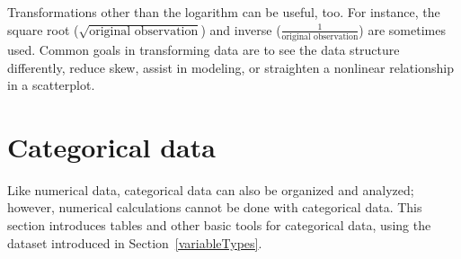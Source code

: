 \begin{doublespace}

Transformations other than the logarithm can be useful, too. For instance, the square root ($\sqrt{\text{original observation}}$) and inverse ($\frac{1}{\text{original observation}}$) are sometimes used. Common goals in transforming data are to see the data structure differently, reduce skew, assist in modeling, or straighten a nonlinear relationship in a scatterplot.


\textC{\newpage}


\section[Categorical data]{Categorical data}
\label{categoricalData}


Like numerical data, categorical data can also be organized and analyzed; however, numerical calculations cannot be done with categorical data. This section introduces tables and other basic tools for categorical data, using the  dataset introduced in Section~\ref{variableTypes}. 


\end{doublespace}
